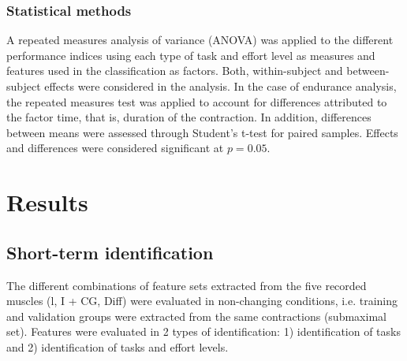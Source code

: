 \subsubsection{Statistical methods}
A repeated measures analysis of variance (ANOVA) was applied to the different performance indices using each type of task and effort level as measures and features used in the classification as factors. Both, within-subject and between-subject effects were considered in the analysis. In the case of endurance analysis, the repeated measures test was applied to account for differences attributed to the factor time, that is, duration of the contraction. In addition, differences between means were assessed through Student’s t-test for paired samples. Effects and differences were considered significant at $p = 0.05$.




\section{Results}

\subsection{Short-term identification}
The different combinations of feature sets extracted from the five recorded muscles (l, I + CG, Diff) were evaluated in non-changing conditions, i.e. training and validation groups were extracted from the same contractions (submaximal set). Features were evaluated in 2 types of identification: 1) identification of tasks and 2) identification of tasks and effort levels.

